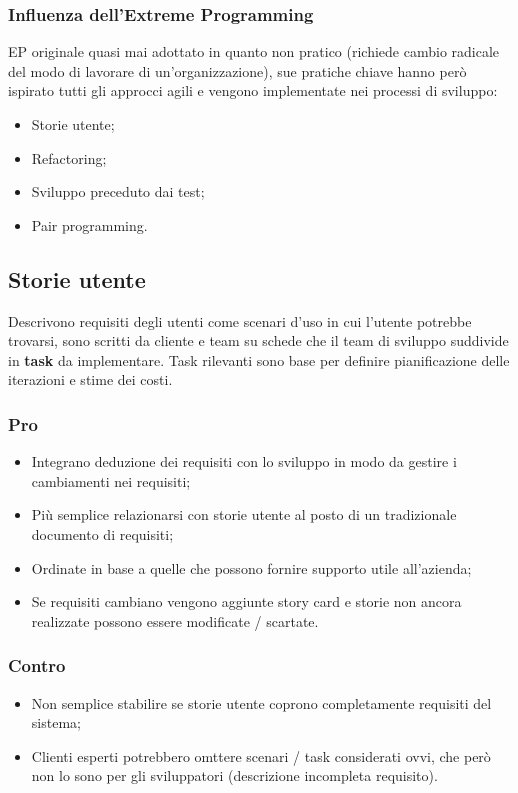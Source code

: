 \documentclass{article}
\begin{document}
      \subsubsection{Influenza dell'Extreme Programming}
        EP originale quasi mai adottato in quanto non pratico (richiede cambio radicale del modo di lavorare di un'organizzazione), sue pratiche chiave hanno però ispirato tutti gli approcci agili e vengono implementate nei processi di sviluppo:
        \begin{itemize}
          \item Storie utente;
          \item Refactoring;
          \item Sviluppo preceduto dai test;
          \item Pair programming. 
        \end{itemize}
    \subsection{Storie utente}
      Descrivono requisiti degli utenti come scenari d'uso in cui l'utente potrebbe trovarsi, sono scritti da cliente e team su schede che il team di sviluppo suddivide in \textbf{task} da implementare. Task rilevanti sono base per definire pianificazione delle iterazioni e stime dei costi. 
      \subsubsection{Pro}
        \begin{itemize}
          \item Integrano deduzione dei requisiti con lo sviluppo in modo da gestire i cambiamenti nei requisiti;
          \item Più semplice relazionarsi con storie utente al posto di un tradizionale documento di requisiti;
          \item Ordinate in base a quelle che possono fornire supporto utile all'azienda;
          \item Se requisiti cambiano vengono aggiunte story card e storie non ancora realizzate possono essere modificate / scartate. 
        \end{itemize}
      \subsubsection{Contro}
        \begin{itemize}
          \item Non semplice stabilire se storie utente coprono completamente requisiti del sistema;
          \item Clienti esperti potrebbero omttere scenari / task considerati ovvi, che però non lo sono per gli sviluppatori (descrizione incompleta requisito).
        \end{itemize}
\end{document}
